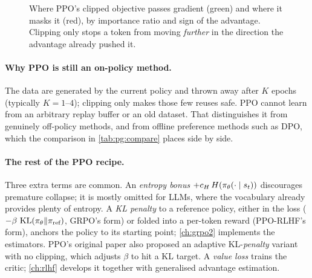 \begin{figure}[t]
\centering
{}
\caption{Where PPO's clipped objective passes gradient (green) and where it masks it (red), by
importance ratio and sign of the advantage. Clipping only stops a token from moving
\emph{further} in the direction the advantage already pushed it.}
\label{fig:pg:clipmask}
\end{figure}

\paragraph{Why PPO is still an on-policy method.} The data are generated by the current policy
and thrown away after $K$ epochs (typically $K=1$--$4$); clipping only makes those few
reuses safe. PPO cannot learn from an arbitrary replay buffer or an old dataset. That
distinguishes it from genuinely off-policy methods, and from offline preference methods such
as DPO, which the comparison in \cref{tab:pg:compare} places side by side.

\paragraph{The rest of the PPO recipe.} Three extra terms are common. An \emph{entropy bonus}
$+c_H\,H(\pi_\theta(\cdot\mid s_t))$ discourages premature collapse; it is mostly omitted for
LLMs, where the vocabulary already provides plenty of entropy. A \emph{KL penalty} to a
reference policy, either in the loss ($-\beta\,\operatorname{KL}(\pi_\theta\|\pi_{\text{ref}})$, GRPO's form) or folded
into a per-token reward (PPO-RLHF's form), anchors the policy to its starting point;
\cref{ch:grpo2} implements the estimators. PPO's original paper also proposed an adaptive
KL-\emph{penalty} variant with no clipping, which adjusts $\beta$ to hit a KL target. A
\emph{value loss} trains the critic; \cref{ch:rlhf} develops it together with generalised
advantage estimation.

